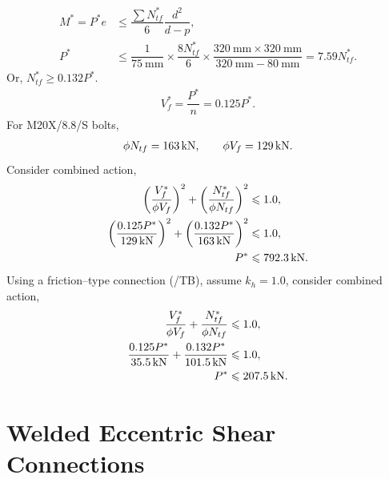 \begin{solution}
\begin{align*}
M^*=P^*e&\leqslant\dfrac{\sum{}N^*_{tf}}{6}\dfrac{d^2}{d-p},\\
P^*&\leqslant\dfrac{1}{\SI{75}{\mm}}\times\dfrac{8N^*_{tf}}{6}\times\dfrac{\SI{320}{\mm}\times\SI{320}{\mm}}{\SI{320}{\mm}-\SI{80}{\mm}}=7.59N^*_{tf}.
\end{align*}
Or, $N^*_{tf}\geqslant0.132P^*$.
\begin{gather*}
V^*_f=\dfrac{P^*}{n}=0.125P^*.
\end{gather*}
For M20X/8.8/S bolts,
\begin{gather*}
\phi{}N_{tf}=\SI{163}{\kilo\newton},\qquad
\phi{}V_f=\SI{129}{\kilo\newton}.
\end{gather*}
Consider combined action,
\begin{align*}
\left(\dfrac{V^*_{f}}{\phi{}V_{f}}\right)^2+\left(\dfrac{N^*_{tf}}{\phi{}N_{tf}}\right)^2&\leqslant1.0,\\
\left(\dfrac{0.125P^*}{\SI{129}{\kilo\newton}}\right)^2+\left(\dfrac{0.132P^*}{\SI{163}{\kilo\newton}}\right)^2&\leqslant1.0,\\
P^*&\leqslant\SI{792.3}{\kilo\newton}.
\end{align*}
Using a friction--type connection (/TB), assume $k_h=1.0$, consider combined action,
\begin{align*}
\dfrac{V^*_{f}}{\phi{}V_{f}}+\dfrac{N^*_{tf}}{\phi{}N_{tf}}&\leqslant1.0,\\
\dfrac{0.125P^*}{\SI{35.5}{\kilo\newton}}+\dfrac{0.132P^*}{\SI{101.5}{\kilo\newton}}&\leqslant1.0,\\
P^*&\leqslant\SI{207.5}{\kilo\newton}.
\end{align*}
\end{solution}
\section{Welded Eccentric Shear Connections}
